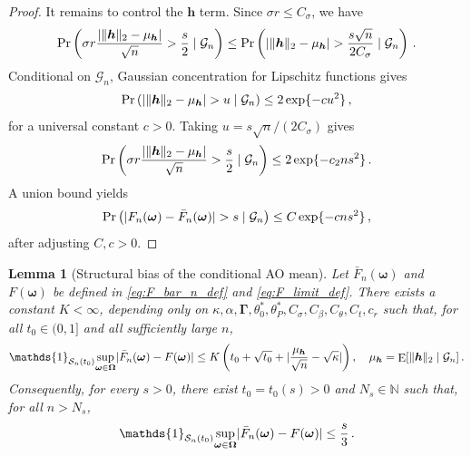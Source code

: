 \documentclass{article}
\makeatletter
\DeclareMathOperator{\expect}{E}
\newtheorem{lemma}{Lemma}
\theoremstyle{definition}
\newcommand{\vnorm}[1]{%
	\ensuremath{%
		\if@display
		\left\| #1 \right\|
		\else
		\| #1 \|
		\fi
	}%
}
\newcommand{\abs}[1]{%
	\ensuremath{%
		\if@display
		\left| #1 \right|
		\else
		\lvert #1 \rvert
		\fi
	}%
}
\newcommand*{\bb}{\boldsymbol}
\def\bh{\bb{h}}
\makeatother
\begin{document}
\begin{bibunit}
\begin{proof}
	It remains to control the $\bh$ term. Since $\sigma r\leq C_\sigma$, we have
	$$
		\Pr\left(
			\sigma r
			\frac{
				\abs{\vnorm{\bh}_2-\mu_{\bh}}
			}{\sqrt n}
			>
			\frac{s}{2}
			\mid
			\mathcal G_n
		\right)
		\leq
		\Pr\left(
			\abs{\vnorm{\bh}_2-\mu_{\bh}}
			>
			\frac{s\sqrt n}{2C_\sigma}
			\mid
			\mathcal G_n
		\right)\,.
	$$
	Conditional on $\mathcal G_n$, Gaussian concentration for Lipschitz
	functions \citep[Theorem~5.2.2]{vershynin:2018} gives
	$$
		\Pr\left(
			\abs{\vnorm{\bh}_2-\mu_{\bh}}
			>
			u
			\mid
			\mathcal G_n
		\right)
		\leq
		2\exp\{-cu^2\}\,,
	$$
		for a universal constant $c>0$. Taking $u=s\sqrt n/(2C_\sigma)$
	gives
	$$
		\Pr\left(
			\sigma r
			\frac{
				\abs{\vnorm{\bh}_2-\mu_{\bh}}
			}{\sqrt n}
			>
			\frac{s}{2}
			\mid
			\mathcal G_n
		\right)
		\leq
		2\exp\{-c_2ns^2\}\,.
	$$
	A union bound yields
	$$
		\Pr\left(
			\abs{
				F_n(\bb\omega)-\bar F_n(\bb\omega)
			}>s
			\mid
			\mathcal G_n
		\right)
		\leq
		C\exp\{-cns^2\}\,,
	$$
	after adjusting $C,c>0$.
\end{proof}

\begin{lemma}[Structural bias of the conditional AO mean]
	\label{lemma:F_n_structural_bias}
	Let $\bar F_n(\bb\omega)$ and $F(\bb\omega)$ be defined in \eqref{eq:F_bar_n_def} and \eqref{eq:F_limit_def}.
		There exists a constant $K<\infty$, depending only on
		$\kappa,\alpha,\bb\Gamma,\theta_0^*,\theta_P^*, C_\sigma,C_\beta,C_\theta,C_t,c_r$
	such that, for all $t_0\in(0,1]$ and all sufficiently large $n$,
	$$
		\mathds{1}_{\mathcal S_n(t_0)}
		\underset{\bb\omega\in\bb\Omega}{\sup}
		\abs{
			\bar F_n(\bb\omega)-F(\bb\omega)
		}
		\leq
		K
		\left(
			t_0+\sqrt{t_0}
			+
			\abs{
				\frac{\mu_{\bh}}{\sqrt n}
				-
				\sqrt\kappa
			}
		\right), \quad \mu_{\bh} = \expect[\vnorm{\bh}_2 \mid \mathcal G_n] \,.
	$$
	Consequently, for every $s>0$, there exist $t_0=t_0(s)>0$ and $N_s\in\mathbb N$ such that, for all $n>N_s$,
	$$
		\mathds{1}_{\mathcal S_n(t_0)}
		\underset{\bb\omega\in\bb\Omega}{\sup}
		\abs{
			\bar F_n(\bb\omega)-F(\bb\omega)
		}
		\leq
		\frac{s}{3} \,.
	$$
\end{lemma}


\end{bibunit}
\end{document}
